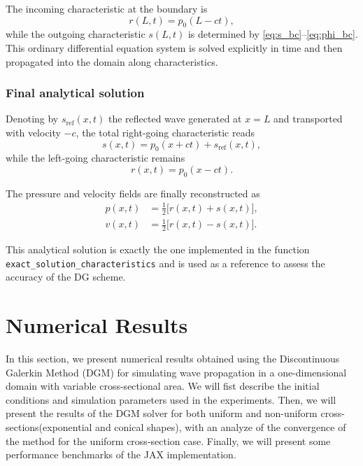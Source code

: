 \documentclass[11pt,a4paper]{report}
\theoremstyle{plain}
\theoremstyle{definition}
\begin{document}
The incoming characteristic at the boundary is
\begin{equation}
r(L,t)=p_0(L-ct), \label{eq:r_boundary}
\end{equation}
while the outgoing characteristic $s(L,t)$ is determined by
\eqref{eq:s_bc}--\eqref{eq:phi_bc}.  
This ordinary differential equation system is solved explicitly in time and then propagated
into the domain along characteristics.

\subsection{Final analytical solution}

Denoting by $s_{\mathrm{ref}}(x,t)$ the reflected wave generated at $x=L$ and transported
with velocity $-c$, the total right-going characteristic reads
\begin{equation}
s(x,t)=p_0(x+ct)+s_{\mathrm{ref}}(x,t),
\end{equation}
while the left-going characteristic remains
\begin{equation}
r(x,t)=p_0(x-ct).
\end{equation}

The pressure and velocity fields are finally reconstructed as
\begin{align}
p(x,t) &= \frac12\bigl[r(x,t)+s(x,t)\bigr], \label{eq:p_final} \\
v(x,t) &= \frac12\bigl[r(x,t)-s(x,t)\bigr]. \label{eq:v_final}
\end{align}

This analytical solution is exactly the one implemented in the function
\texttt{exact\_solution\_characteristics} and is used as a reference to assess the accuracy
of the DG scheme.

\chapter{Numerical Results}

\minitoc
\vspace{1em}
In this section, we present numerical results obtained using the Discontinuous Galerkin Method (DGM) 
for simulating wave propagation in a one-dimensional domain with variable cross-sectional area.
We will fist describe the initial conditions and simulation parameters used in the experiments.
Then, we will present the results of the DGM solver for both uniform and non-uniform cross-sections(exponential and conical shapes),
with an analyze of the convergence of the method for the uniform cross-section case. 
Finally, we will present some performance benchmarks of the JAX implementation.
\end{document}
